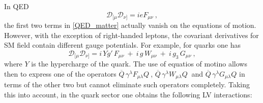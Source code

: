 \documentclass[12pt,preprintnumbers,nofootinbib]{revtex4}
\newcommand{\ov}{\overline}
\begin{document}
	In QED
\begin{equation}
\label{Fmn}
	\mathcal{D}_{[\mu}\mathcal{D}_{\nu]} = i e F_{\mu\nu}~, 
\end{equation} 
	the first two terms in \eqref{QED_matter} actually vanish on 
	the equations of motion.
	However, with the exception of right-handed leptons, 
	the covariant derivatives for SM field contain different gauge potentials. 
	For example, for quarks one has
\begin{equation}
\label{FmnQCD}
	\mathcal{D}_{[\mu}\mathcal{D}_{\nu]} = 
	i\, Y g'\, F_{\mu\nu} ~+~ 
	i\, g\, W_{\mu\nu} ~+~
	i\, g_3\, G_{\mu\nu}~,
\end{equation}
	where $ Y $ is the hypercharge of the quark.
	The use of equatios of motino allows then to express one of the operators 
$ \ov{Q}\, \gamma^\lambda F_{\mu\lambda} Q~ $,
$ \ov{Q}\, \gamma^\lambda W_{\mu\lambda} Q~ $ and
$ \ov{Q}\, \gamma^\lambda G_{\mu\lambda} Q $
	in terms of the other two but cannot eliminate such operators completely.
	Taking this into account, 
	in the quark sector 
	one obtains the following LV interactions:
\end{document}
